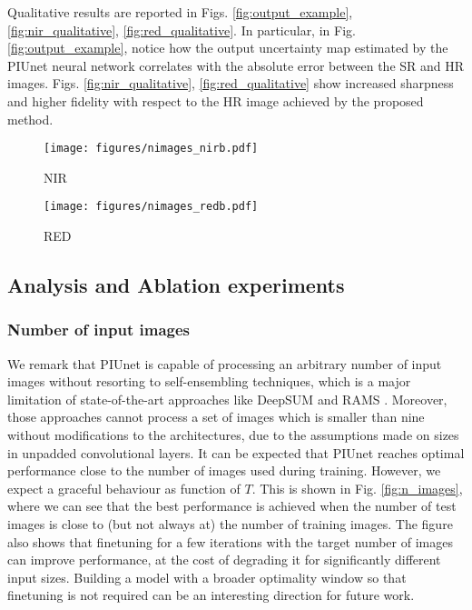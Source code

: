 \documentclass[journal]{IEEEtran}
\begin{document}
Qualitative results are reported in Figs. \ref{fig:output_example}, \ref{fig:nir_qualitative}, \ref{fig:red_qualitative}. In particular, in Fig.\ref{fig:output_example}, notice how the output uncertainty map estimated by the PIUnet neural network correlates with the absolute error between the SR and HR images. Figs. \ref{fig:nir_qualitative}, \ref{fig:red_qualitative} show increased sharpness and higher fidelity with respect to the HR image achieved by the proposed method.



\begin{figure*}[ht]
    \centering
    \begin{subfigure}[b]{0.45\textwidth}
    \centering
    \texttt{[image: figures/nimages\_nirb.pdf]}
    \caption{NIR}
    \end{subfigure}
    \begin{subfigure}[b]{0.45\textwidth}
    \centering
    \texttt{[image: figures/nimages\_redb.pdf]}
    \caption{RED}
    \end{subfigure}
    \caption{Performance on the validation set as function of number of input LR images. Notice how the trained model gracefully handles any input size, but optimal performance may require finetuning.}
    \label{fig:n_images}
\end{figure*}


\subsection{Analysis and Ablation experiments}

\subsubsection{Number of input images}
We remark that PIUnet is capable of processing an arbitrary number of input images without resorting to self-ensembling techniques, which is a major limitation of state-of-the-art approaches like DeepSUM \cite{molini2019deepsum} and RAMS \cite{salvetti2020multi}. Moreover, those approaches cannot process a set of images which is smaller than nine without modifications to the architectures, due to the assumptions made on sizes in unpadded convolutional layers. It can be expected that PIUnet reaches optimal performance close to the number of images used during training. However, we expect a graceful behaviour as function of $T$. This is shown in Fig. \ref{fig:n_images}, where we can see that the best performance is achieved when the number of test images is close to (but not always at) the number of training images. The figure also shows that finetuning for a few iterations with the target number of images can improve performance, at the cost of degrading it for significantly different input sizes. Building a model with a broader optimality window so that finetuning is not required can be an interesting direction for future work. 
\end{document}
